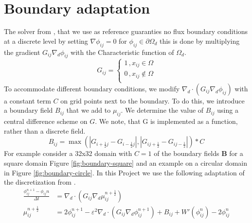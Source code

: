 \documentclass{mimosis}
\begin{document}
\chapter{Boundary adaptation}
\label{sec:org65f9e05}
The solver from \autocite{SHIN20117441}, that we use as reference guaranties no flux boundary conditions at a discrete level by setting \(\nabla \phi_{ij} = 0\) for \(\phi_{ij} \in \partial \Omega_{d}\) this is done by multiplying the gradient \(G_{ij} \nabla_d \phi_{ij}\) with the Characteristic function of \(\Omega_{d}\).
\begin{equation}
G_{ij}=
\begin{cases}
1 \,, x_{ij} \in \Omega \\
0 \,, x_{ij} \not\in \Omega \\
\end{cases}
\end{equation}
To accommodate different boundary conditions, we modify \(\nabla_d \cdot (G_{ij} \nabla_d \phi_{ij})\) with a constant term \(C\) on grid points next to the boundary. To do this, we introduce a boundary field \(B_{ij}\) that we add to \(\mu_{ij}\). We determine the value of \(B_{ij}\) using a central difference scheme on \(G\). We note, that G is implemented as a function, rather than a discrete field.
\begin{equation}
B_{ij} = \max\left(  |G_{i+\frac{1}{2}j} - G_{i-\frac{1}{2}j}| , |G_{ij+\frac{1}{2}} - G_{ij-\frac{1}{2}}|\right) * C
\end{equation}
For example consider a 32x32 domain with \(C=1\) of the boundary fields \(\mathbf{B}\) for a square domain Figure \ref{fig:boundary-square} and an example on a circular domain in Figure \ref{fig:boundary-circle}.
In this Project we use the following adaptation of the discretization from \autocite{SHIN20117441}.
\begin{equation}
\label{eq:second-order-adapted-ansatz}
\begin{aligned}
\frac{\phi_{ij}^{n+1} - \phi_{ij}n}{\Delta t}  &=  \nabla _d \cdot (G_{ij} \nabla_d \mu_{ij}^{n+\frac{1}{2}} )  \\
 \mu_{ij}^{n+\frac{1}{2}} &= 2\phi_{ij}^{n+1} - \varepsilon^2  \nabla_d \cdot  (G_{ij} \nabla _d \phi_{ij}^{n+1} ) + B_{ij} + W'(\phi_{ij}^n) - 2\phi _{ij}^n
\end{aligned}
\end{equation}
\end{document}
